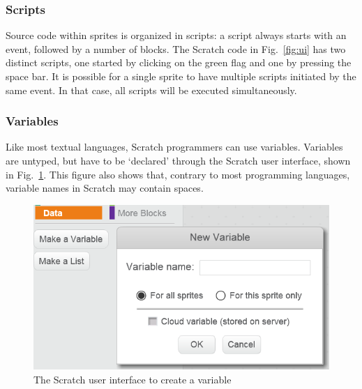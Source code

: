 \documentclass[conference]{IEEEtran}
\begin{document}

\subsubsection{Scripts}
Source code within sprites is organized in scripts: a script always starts with an event, followed by a number of blocks. The Scratch code in Fig.~\ref{fig:ui} has two distinct scripts, one started by clicking on the green flag and one by pressing the space bar. It is possible for a single sprite to have multiple scripts initiated by the same event. In that case, all scripts will be executed simultaneously. 



\subsubsection{Variables}
Like most textual languages, Scratch programmers can use variables. Variables are untyped, but have to be `declared' through the Scratch user interface, shown in Fig.~\ref{fig:ui-vars}. This figure also shows that, contrary to most programming languages, variable names in Scratch may contain spaces.

\begin{figure}
  \begin{center}
  \includegraphics[scale=0.35]{fig/ui-vars.png}
  \caption{The Scratch user interface to create a variable}
  \label{fig:ui-vars}
  \end{center}
\end{figure} 
\end{document}
